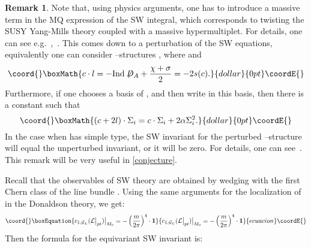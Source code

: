 \documentclass[a4paper,12pt,reqno,sumlimits]{amsart}
\theoremstyle{plain}
\theoremstyle{definition}
\newtheorem{rem}[thm]{Remark}
\providecommand{\1}{{\bf 1}}
\providecommand{\calG}{{\mathcal G}}
\providecommand{\calL}{{\mathcal L}}
\providecommand{\spinc}{\myHighlight{$\text{spin}^c$}\coordHE{}}
\providecommand{\Dirac}{\not\!\!D}
\providecommand{\Ind}{{\operatorname{Ind}}}
\numberwithin{equation}{section}
\begin{document}
\begin{rem}
  \label{swrem}
  Note that, using physics arguments, one has to introduce a massive term in
  the MQ expression of the SW integral, which corresponds to twisting the
  \coordHE{} SUSY Yang-Mills theory coupled with a massive hypermultiplet. For
  details, one can see e.g.~\cite{park},~\cite{ewmono}.  This comes down to a
  perturbation of the SW equations, equivalently one can consider
  \spinc--structures \coordHE{}, where \coordHE{} and
  $$\coord{}\boxMath{
  c\cdot l = -\Ind\Dirac_A+\frac{\chi+\sigma}{2}=-2s(c).
  }{dollar}{0pt}\coordE{}$$
  Furthermore, if one chooses a basis \coordHE{} of
  \coordHE{}, and then write \coordHE{} in this basis, then there is a constant
  \myHighlight{$\alpha$}\coordHE{} such that
  $$\coord{}\boxMath{
  (c+2l)\cdot\Sigma_i = c\cdot\Sigma_i + 2\alpha\Sigma_i^2.
  }{dollar}{0pt}\coordE{}$$
  In the case when \coordHE{} has simple type, the SW invariant for the perturbed
  \spinc--structure will equal the unperturbed invariant, or it will be zero.
  For details, one can see~\cite{szabo1}.  This remark will be very useful in
  \myHighlight{$\S$}\coordHE{}\ref{conjecture}.
\end{rem}
Recall that the observables of SW theory are obtained by wedging with the
first Chern class of the line bundle \myHighlight{$\calL\big|_{pt}$}\coordHE{}. Using the same
arguments for the localization of \myHighlight{$\mu(\nu)$}\coordHE{} in the Donaldson theory, we get:
\begin{equation}\coord{}\boxEquation{
  \label{swobsres}
  c_{1,\calG_L}(\calL\big|_{pt})\big|_{M_0}=-\left(\frac{m}{2\pi}\right)^4\cdot\1
}{
  c_{1,\calG_L}(\calL\big|_{pt})\big|_{M_0}=-\left(\frac{m}{2\pi}\right)^4\cdot\1
}{ecuacion}\coordE{}\end{equation}
Then the formula for the equivariant SW invariant is:
\end{document}
